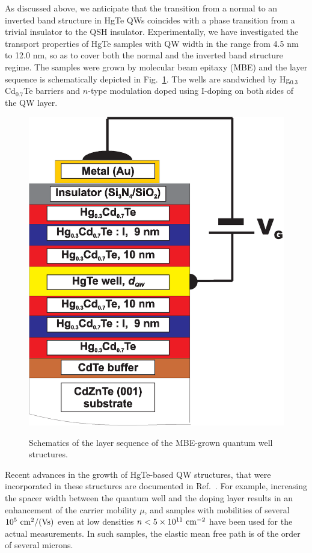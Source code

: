\documentclass{article}
\begin{document}
As discussed above, we anticipate that the transition from a normal
to an inverted band structure in HgTe QWs coincides with a phase
transition from a trivial insulator to the QSH insulator.
Experimentally, we have investigated the transport properties of
HgTe samples  with QW width in the range from 4.5 nm to 12.0 nm, so
as to cover both the normal and the inverted band structure regime.
The samples were grown by molecular beam epitaxy (MBE) and the layer
sequence is schematically depicted in Fig.~\ref{FigMBE}. The wells
are sandwiched by Hg$_{0.3}$Cd$_{0.7}$Te barriers and  $n$-type
modulation doped using I-doping on both sides of the QW layer.
\begin{figure}[htb]
\centering
 \includegraphics[width=0.8\linewidth]{80608Fig06.eps}\\
 \caption{Schematics of the layer sequence of the MBE-grown quantum well
 structures.}
 \label{FigMBE}
\end{figure}
Recent advances in the growth of HgTe-based QW structures, that were incorporated in these
structures are documented in Ref.~\cite{Becker07}. For example, increasing
the spacer width between the quantum well and the doping layer
results in an enhancement of the carrier mobility $\mu$, and samples
with mobilities of several $10^5~{\rm cm}^2/{\rm (Vs)}$ even at low
densities $n<5\times 10^{11}~{\rm cm}^{-2}$ have been used for the
actual measurements. In such samples, the elastic mean free path is of the
order of several microns.
\end{document}

